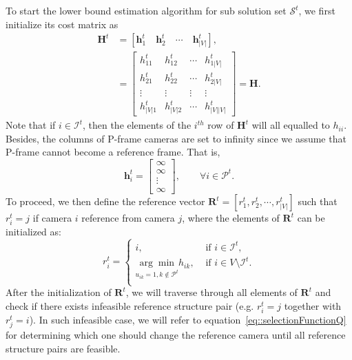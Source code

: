 To start the lower bound estimation algorithm for sub solution set $\mathcal{S}^t$, we first initialize its cost matrix as
\begin{align}
\mathbf{H}^t
&= \left[ \mathbf{h}_1^t \quad \mathbf{h}_2^t \quad \cdots \quad \mathbf{h}_{|V|}^t \right], \nonumber \\
&= \left[ \begin{array}{cccc}
h_{11}^t &h_{12}^t &\cdots &h_{1|V|}^t \\
h_{21}^t &h_{22}^t &\cdots &h_{2|V|}^t \\
\vdots &\vdots &\vdots &\vdots \\
h_{|V|1}^t &h_{|V|2}^t &\cdots &h_{|V||V|}^t
\end{array} \right]
= \mathbf{H}.
\label{eq::modBBcostMatrix}
\end{align}
Note that if $i \in \mathcal{I}^t$, then the elements of the $i^{th}$ row of $\mathbf{H}^t$ will all equalled to $h_{ii}$.
Besides, the columns of P-frame cameras are set to infinity since we assume that P-frame cannot become a reference frame.
That is,
\begin{equation}
\mathbf{h}^t_i = \left[ \begin{array}{c}
\infty \\
\infty \\
\vdots \\
\infty
\end{array} \right],
\quad \quad \forall i \in \mathcal{P}^t.
\label{eq::infColumn}
\end{equation}
To proceed, we then define the reference vector ${\mathbf{R}^t = [r_1^t,r_2^t,\cdots,r_{|V|}^t]}$ such that $r_i^t = j$ if camera $i$ reference from camera $j$, where the elements of $\mathbf{R}^t$ can be initialized as:
\begin{equation}
r_i^t = 
\left\{ \begin{array}{cc}
i,  &\text{ if $i \in \mathcal{I}^t$,} \\                  	   
\underset{u_{ik}=1, k \notin \mathcal{P}^t}{\arg\min} h_{ik},  &\text{ if $i \in V\setminus \mathcal{I}^t$.} \\
\end{array} \right.
\label{eq::initRefStructure}
\end{equation}
After the initialization of $\mathbf{R}^t$, we will traverse through all elements of $\mathbf{R}^t$ and check if there exists infeasible reference structure pair (e.g. $r_i^t = j$ together with $r_j^t=i$).
In such infeasible case, we will refer to equation~\eqref{eq::selectionFunctionQ} for determining which one should change the reference camera until all reference structure pairs are feasible.
